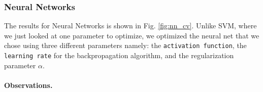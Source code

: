 \documentclass[10pt]{scrartcl}
\begin{document}
\subsubsection*{Neural Networks}
The results for Neural Networks is shown in Fig. \ref{fig:nn_cv}. Unlike SVM, where we just looked at one parameter to optimize, we optimized the neural net that we chose using three different parameters namely: the \texttt{activation function}, the \texttt{learning rate} for the backpropagation algorithm, and the regularization parameter $\mathtt{\alpha}$.

\paragraph{Observations.}
\end{document}
